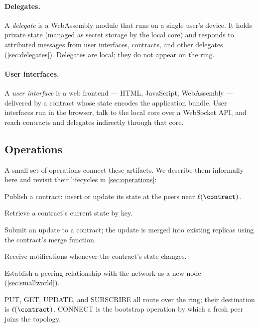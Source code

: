 \paragraph{Delegates.} A \emph{delegate} is a WebAssembly module that runs on a single user's device. It holds private state (managed as secret storage by the local core) and responds to attributed messages from user interfaces, contracts, and other delegates (\cref{sec:delegates}). Delegates are local; they do not appear on the ring.

\paragraph{User interfaces.} A \emph{user interface} is a web frontend --- HTML, JavaScript, WebAssembly --- delivered by a contract whose state encodes the application bundle. User interfaces run in the browser, talk to the local core over a WebSocket API, and reach contracts and delegates indirectly through that core.

\subsection{Operations}
\label{sec:ops-summary}

A small set of operations connect these artifacts. We describe them informally here and revisit their lifecycles in \cref{sec:operations}:

\begin{description}[leftmargin=1.4em, style=nextline, itemsep=2pt]
  \item[\textsf{PUT}] Publish a contract: insert or update its state at the peers near $\ell(\contract)$.
  \item[\textsf{GET}] Retrieve a contract's current state by key.
  \item[\textsf{UPDATE}] Submit an update to a contract; the update is merged into existing replicas using the contract's merge function.
  \item[\textsf{SUBSCRIBE}] Receive notifications whenever the contract's state changes.
  \item[\textsf{CONNECT}] Establish a peering relationship with the network as a new node (\cref{sec:smallworld}).
\end{description}

\textsf{PUT}, \textsf{GET}, \textsf{UPDATE}, and \textsf{SUBSCRIBE} all route over the ring; their destination is $\ell(\contract)$. \textsf{CONNECT} is the bootstrap operation by which a fresh peer joins the topology.

